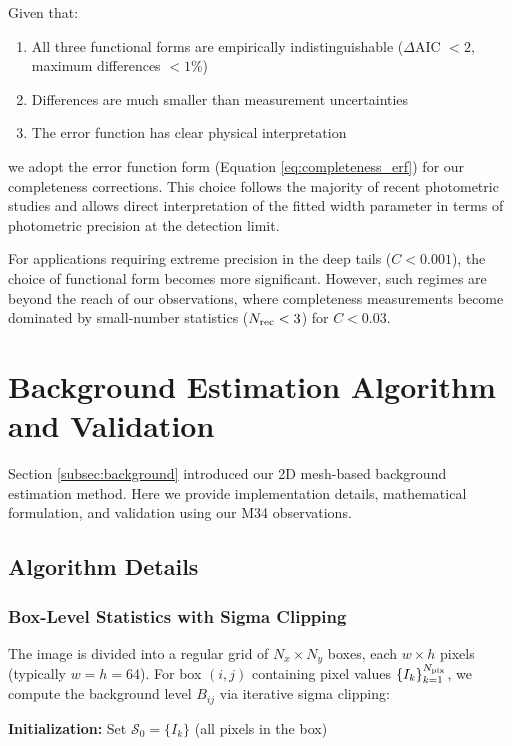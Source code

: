 \documentclass[linenumbers,trackchanges,twocolumn]{aastex701}
\begin{document}
Given that:
\begin{enumerate}
\item All three functional forms are empirically indistinguishable ($\Delta$AIC $< 2$, maximum differences $< 1\%$)
\item Differences are much smaller than measurement uncertainties
\item The error function has clear physical interpretation
\end{enumerate}

we adopt the error function form (Equation \ref{eq:completeness_erf}) for our completeness corrections. This choice follows the majority of recent photometric studies and allows direct interpretation of the fitted width parameter in terms of photometric precision at the detection limit.

For applications requiring extreme precision in the deep tails ($C < 0.001$), the choice of functional form becomes more significant. However, such regimes are beyond the reach of our observations, where completeness measurements become dominated by small-number statistics ($N_{\rm rec} < 3$) for $C < 0.03$.

\section{Background Estimation Algorithm and Validation} \label{app:background}

Section \ref{subsec:background} introduced our 2D mesh-based background estimation method. Here we provide implementation details, mathematical formulation, and validation using our M34 observations.

\subsection{Algorithm Details}

\subsubsection{Box-Level Statistics with Sigma Clipping}

The image is divided into a regular grid of $N_x \times N_y$ boxes, each $w \times h$ pixels (typically $w = h = 64$). For box $(i,j)$ containing pixel values $\{I_k\}_{k=1}^{N_{\rm pix}}$, we compute the background level $B_{ij}$ via iterative sigma clipping:

\textbf{Initialization:} Set $\mathcal{S}_0 = \{I_k\}$ (all pixels in the box)
\end{document}
